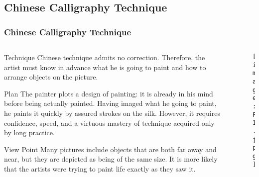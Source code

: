 \documentclass[pdflatex,compress,8pt,
	xcolor={dvipsnames,dvipsnames,svgnames,x11names,table},
	hyperref={	
	breaklinks = true, 
	pdfauthor={Lemenkova Polina}, 
	pdfsubject={Preentation}, 
	pdfcreator={Lemenkova Polina}, 
	pdfproducer={Lemenkova Polina}, 
	colorlinks=true,
	linkcolor=NavyBlue, 
	citecolor=NavyBlue, 
	urlcolor = NavyBlue, 
	breaklinks = true}]{beamer}
\begin{document}
\subsection{Chinese Calligraphy Technique}
\begin{frame}\frametitle{Chinese Calligraphy Technique}

	\begin{minipage}[0.4\textheight]{\textwidth}
		\begin{columns}[T]
			\begin{column}{0.5\textwidth}
	\small{
	\begin{alertblock}{Technique}
	Chinese technique admits no correction. Therefore, the artist must know in advance \alert{what} he is going to paint and \alert{how} to arrange objects on the picture. 
	\end{alertblock}

	\begin{block}{Plan}
	The painter plots a design of painting: it is already in his mind before being actually painted. Having imaged what he going to paint, he paints it quickly by assured strokes on the silk. However, it requires confidence, speed, and a virtuous mastery of technique acquired only by long practice.
	\end{block}
	
	\begin{block}{View Point}
	Many pictures include objects that are both far away and near, but they are depicted as being of the same size. It is more likely that the artists were trying to paint life exactly as they saw it.
	\end{block}
	}
			\end{column}
			\begin{column}{0.5\textwidth}
\begin{figure}[H]
	\centering
		\texttt{[image: F1.jpg]}
\end{figure}
			\end{column}
		\end{columns}
	\end{minipage}


	
\end{frame}
\end{document}

